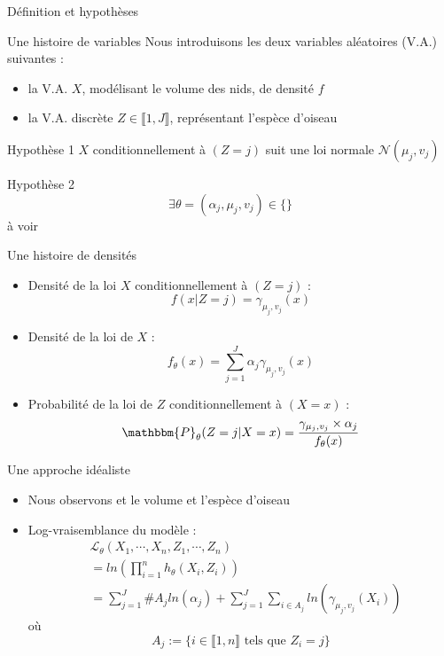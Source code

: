 \documentclass[11pt]{beamer}
\begin{document}
	\begin{frame}{Définition et hypothèses}
		\begin{block}{Une histoire de variables}
			Nous introduisons les deux variables aléatoires (V.A.) suivantes :
			\begin{itemize}
				\item la V.A. $X$, modélisant le volume des nids, de densité $f$
				\item la V.A. discrète $Z \in \llbracket 1,J\rrbracket$, représentant l'espèce d'oiseau
			\end{itemize}
		\end{block}

		\begin{block}{Hypothèse 1}
			$X$ conditionnellement à $(Z = j)$ suit une loi normale $\mathcal{N}(\mu_j, v_j)$
		\end{block}
		\begin{block}{Hypothèse 2}
			\[
			\exists \theta = (\alpha_j, \mu_j, v_j) \in \{  \}
			\]
à voir
		\end{block}
	\end{frame}

	\begin{frame}{Une histoire de densités}
		\begin{block}{}
			\scriptsize
			\begin{itemize}
				\item Densité de la loi $X$ conditionnellement à $(Z=j)$ :
				\[
				f(x| Z = j)  = \gamma_{\mu_j, v_j}(x)
				\]
				\item Densité de la loi de $X$ :
					\[
					f_\theta(x) = \displaystyle\sum_{j=1}^J \alpha_j \gamma_{\mu_j, v_j}(x)
					\]
				\item Probabilité de la loi de $Z$ conditionnellement à $(X = x)$ : 
					\[
					\mathbbm{P}_\theta(Z = j | X = x)=\displaystyle \frac{\gamma_{\mu_j, v_j}\times\alpha_j}{f_\theta(x)}
					\]
			\end{itemize}
		\end{block}
	\end{frame}

	

	\begin{frame}{Une approche idéaliste}
		\begin{block}{}
			\scriptsize
			\begin{itemize}
				\item Nous observons et le volume et l'espèce d'oiseau
				\item Log-vraisemblance du modèle :
				\begin{align*}
				& \mathcal{L}_\theta(X_1, \cdots, X_n, Z_1, \cdots, Z_n) \\
				&= ln\left(\displaystyle\prod_{i=1}^n h_\theta(X_i, Z_i) \right) \\
				&=\displaystyle\sum_{j=1}^J \#A_j ln(\alpha_j)+ \sum_{j=1}^J\sum_{i\in A_j} ln(\gamma_{\mu_j, v_j}(X_i))
				\end{align*}
				où
				\[
				A_j := \{ i\in \llbracket1,n \rrbracket \text{ tels que } Z_i = j \}
				\]
			\end{itemize}
		\end{block}
	\end{frame}
\end{document}
